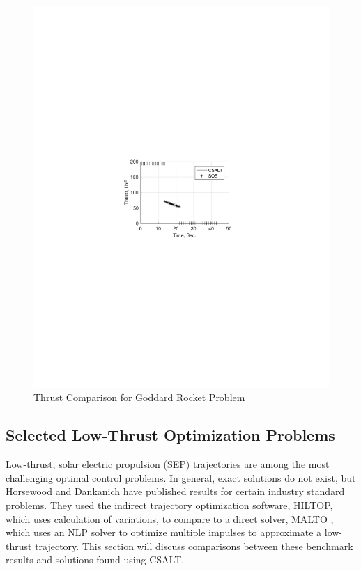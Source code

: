 \documentclass[ISTS  ]{tjsass} %
\begin{document}
\begin{figure}
    \centering
    \includegraphics[width=\columnwidth]{../Figures/GoddardRocket_ThrustVsTime}
    \caption{Thrust Comparison for Goddard Rocket Problem}
    \label{fig:goddard_thrust}
\end{figure}

\subsection{Selected Low-Thrust Optimization Problems}

Low-thrust, solar electric propulsion (SEP) trajectories are among the most challenging optimal control problems. In general, exact solutions do not exist, but Horsewood and Dankanich\cite{Horsewood:a} have published results for certain industry standard problems. They used the indirect trajectory optimization software, HILTOP, which uses calculation of variations, to compare to a direct solver, MALTO \cite{Sims:a}, which uses an NLP solver to optimize multiple impulses to approximate a low-thrust trajectory. This section will discuss comparisons between these benchmark results and solutions found using CSALT.
\end{document}
